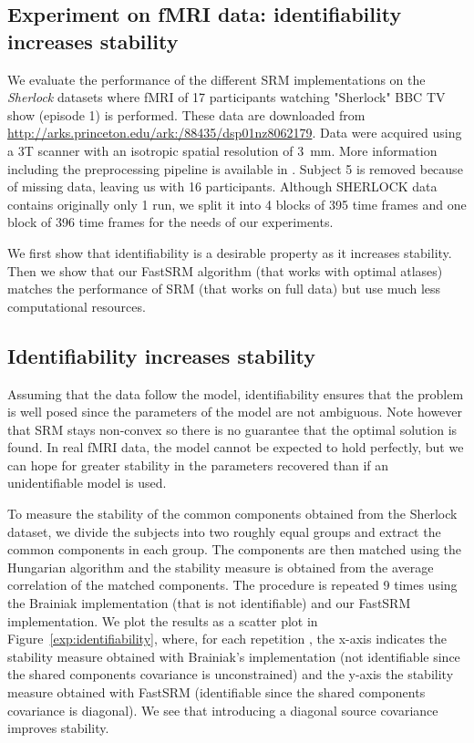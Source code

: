 \documentclass{article}
\newcommand{\bt}[1]{\todo[color=orange, inline=True]{BT: #1}}
\begin{document}
\subsection{Experiment on fMRI data: identifiability increases stability}
We evaluate the performance of the different SRM implementations on the
\emph{Sherlock} datasets where fMRI of 17 participants watching "Sherlock" BBC
TV show (episode 1) is performed.
%
% 
These data are downloaded from
\url{http://arks.princeton.edu/ark:/88435/dsp01nz8062179}.
%
% 
Data were acquired using a 3T scanner with an isotropic spatial resolution of
3~mm.
%
% 
More information including the preprocessing pipeline is available in
\cite{sherlock}.
%
% 
Subject 5 is removed because of missing data, leaving us with 16 participants.
%
% 
Although SHERLOCK data contains originally only 1 run, we split it into 4 blocks
of 395 time frames and one block of 396 time frames for the needs of our
experiments.
%



We first show that identifiability is a desirable property as it increases
stability.
%
Then we show that our FastSRM algorithm (that works with optimal atlases)
matches the performance of SRM (that works on full data) but use much less
computational resources.
%


\subsection{Identifiability increases stability}
Assuming that the data follow the model, identifiability ensures that the
problem is well posed since the parameters of the model are not ambiguous. Note however that SRM
stays non-convex so there is no guarantee that the optimal solution is found.
%
%
In real fMRI data, the model cannot be expected to hold perfectly, but we can
hope for greater stability in the parameters recovered than if an unidentifiable
model is used.
%


To measure the stability of the common components obtained from the Sherlock
dataset, we divide the subjects into two roughly equal groups and extract the
common components in each group.
%
The components are then matched using the Hungarian algorithm and the stability
measure is obtained from the average correlation of the matched components.
%
The procedure is repeated 9 times using the Brainiak implementation (that is not
identifiable) and our
FastSRM implementation.
%
We plot the results as a scatter plot in Figure~\ref{exp:identifiability}, where, for each repetition , the x-axis indicates the stability measure obtained with Brainiak's implementation
(not identifiable since the shared components covariance is unconstrained) and the y-axis the stability measure
obtained with FastSRM (identifiable since the shared components covariance is diagonal).
%
We see that introducing a diagonal source covariance improves stability.
%
\end{document}
